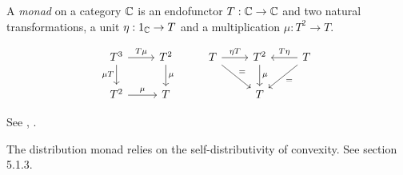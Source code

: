 \documentclass[12pt]{article}
\begin{document}
A \emph{monad} on a category $\mathbb{C}$ is an endofunctor $T:\mathbb{C}\to \mathbb{C}$
and two natural transformations,
a unit $\eta:1_{\mathbb{C}}\to T$ and a multiplication $\mu:T^2\to T.$

\[
\begin{tikzcd}
T^3 \arrow{r}{T\mu} \arrow[swap]{d}{\mu T} & T^2 \arrow{d}{\mu} & 
T \arrow{r}{\eta T}\arrow{dr}{=} & T^2 \arrow{d}{\mu} & \arrow[swap]{l}{T\eta}\arrow{dl}{=} T \\
T^2 \arrow{r}{\mu} & T & 
& T & 
\end{tikzcd}
\]


See \cite{Mac1978}, \cite{Jacobs2012}.

The distribution monad relies on the self-distributivity of convexity.
See \cite{Jacobs2012} section 5.1.3.






{}

\end{document}
